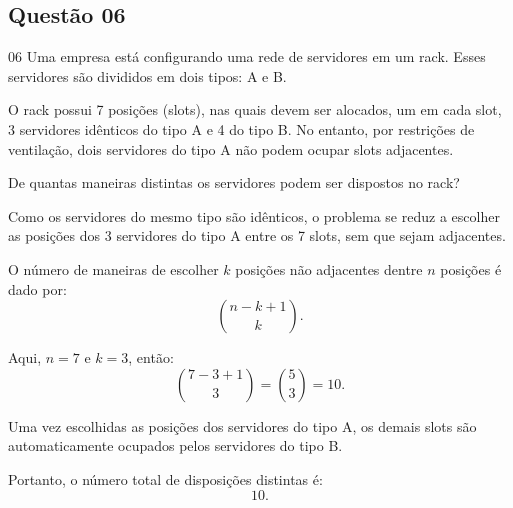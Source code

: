 \subsection*{Questão 06}

\begin{questionbox}{06}
Uma empresa está configurando uma rede de servidores em um rack. Esses servidores são divididos em dois tipos: A e B. 

O rack possui 7 posições (slots), nas quais devem ser alocados, um em cada slot, 3 servidores idênticos do tipo A e 4 do tipo B. No entanto, por restrições de ventilação, dois servidores do tipo A não podem ocupar slots adjacentes. 

De quantas maneiras distintas os servidores podem ser dispostos no rack?
\end{questionbox}

\begin{solutionbox}
Como os servidores do mesmo tipo são idênticos, o problema se reduz a escolher as posições dos 3 servidores do tipo A entre os 7 slots, sem que sejam adjacentes.

O número de maneiras de escolher $k$ posições não adjacentes dentre $n$ posições é dado por:
\[
\binom{n - k + 1}{k}.
\]

Aqui, $n = 7$ e $k = 3$, então:
\[
\binom{7 - 3 + 1}{3} = \binom{5}{3} = 10.
\]
\end{solutionbox}

\begin{solutionbox}
Uma vez escolhidas as posições dos servidores do tipo A, os demais slots são automaticamente ocupados pelos servidores do tipo B.

Portanto, o número total de disposições distintas é:
\[
\boxed{10}.
\]
\end{solutionbox}
